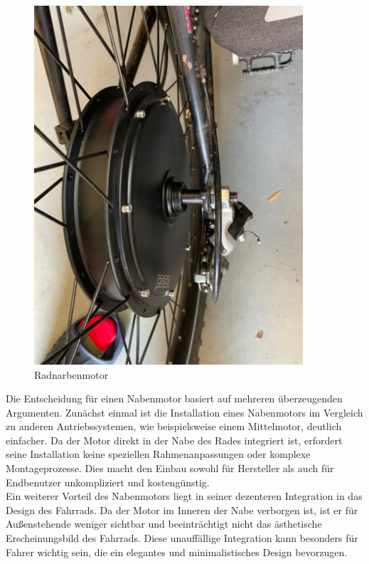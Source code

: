 \begin{figure}[h]
    \centering
    \includegraphics[width=10cm]{images/Radnabenmotor.jpg}
    \caption{Radnarbenmotor\cite{lorenz_scherrer_selbst_2023}}%
    \label{fig:9}
\end{figure}


Die Entscheidung für einen Nabenmotor basiert auf mehreren überzeugenden Argumenten. Zunächst einmal ist die Installation eines Nabenmotors im Vergleich zu anderen Antriebssystemen, wie beispielsweise einem Mittelmotor, deutlich einfacher. Da der Motor direkt in der Nabe des Rades integriert ist, erfordert seine Installation keine speziellen Rahmenanpassungen oder komplexe Montageprozesse. Dies macht den Einbau sowohl für Hersteller als auch für Endbenutzer unkompliziert und kostengünstig.\\

Ein weiterer Vorteil des Nabenmotors liegt in seiner dezenteren Integration in das Design des Fahrrads. Da der Motor im Inneren der Nabe verborgen ist, ist er für Außenstehende weniger sichtbar und beeinträchtigt nicht das ästhetische Erscheinungsbild des Fahrrads. Diese unauffällige Integration kann besonders für Fahrer wichtig sein, die ein elegantes und minimalistisches Design bevorzugen.\\

